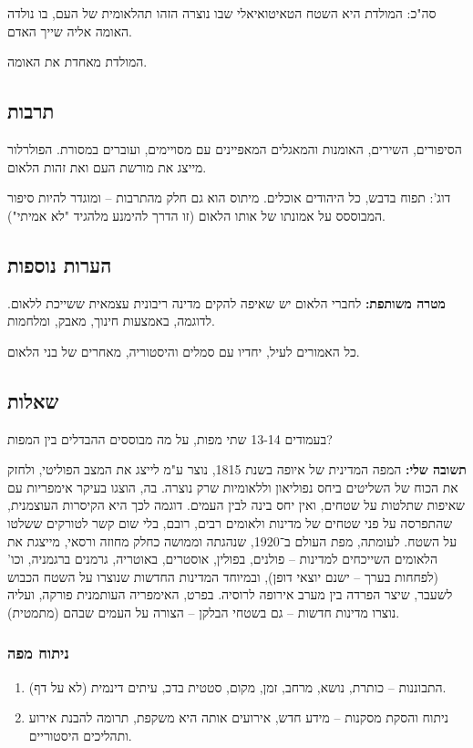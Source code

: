 \documentclass[a4paper]{book}
\begin{document}
	סה"כ: המולדת היא השטח הטאיטואיאלי שבו נוצרה הזהו תהלאומית של העם, בו נולדה האומה אליה שייך האדם. 
	
	המולדת מאחדת את האומה. 
	
	\subsection{תרבות}
	הסיפורים, השירים, האומנות והמאגלים המאפיינים עם מסויימים, ועוברים במסורת. הפולרלור מייצג את מורשת העם ואת זהות הלאום. 
	
	דוג': תפוח בדבש, כל היהודים אוכלים. מיתוס הוא גם חלק מהתרבות – ומוגדר להיות סיפור המבוססס על אמונתו של אותו הלאום (זו הדרך להימנע מלהגיד "לא אמיתי"). 
	
	\subsection{הערות נוספות}
	
	\textbf{מטרה משותפת: }לחברי הלאום יש שאיפה להקים מדינה ריבונית עצמאית ששייכת ללאום. לדוגמה, באמצעות חינוך, מאבק, ומלחמות. 
	
	כל האמורים לעיל, יחדיו עם סמלים והיסטוריה, מאחרים של בני הלאום. 
	
	\subsection{שאלות}
	בעמודים 13-14 שתי מפות, על מה מבוססים ההבדלים בין המפות? 
	
	\textbf{תשובה שלי: }המפה המדינית של איופה בשנת 1815, נוצר ע"מ לייצג את המצב הפוליטי, ולחזק את הכוח של השליטים ביחס נפוליאון וללאומיות שרק נוצרה. בה, הוצגו בעיקר אימפריות עם שאיפות שתלטות על שטחים, ואין יחס בינה לבין העמים. דוגמה לכך היא הקיסרות העוצמנית, שהתפרסה על פני שטחים של מדינות ולאומים רבים, רובם, בלי שום קשר לטורקים ששלטו על השטח. לעומתה, מפת העולם ב־1920, שנהגתה וממושה כחלק מחוזה ורסאי, מייצגת את הלאומים השייכחים למדינות – פולנים, בפולין, אוסטרים, באוטריה, גרמנים ברגמניה, וכו' (לפחחות בערך – ישנם יוצאי דופן), ובמיוחד המדינות החדשות שנוצרו על השטח הכבוש לשעבר, שיצר הפרדה בין מערב אירופה לרוסיה. בפרט, האימפריה העותמנית פורקה, ועליה נוצרו מדינות חדשות – גם בשטחי הבלקן – הצורה על העמים שבהם (מתמטית). 
	
	\subsubsection{ניתוח מפה}
	
	\begin{enumerate}
		\item התבוננות – כותרת, נושא, מרחב, זמן, מקום, סטטית בדכ, עיתים דינמית (לא על דף). 
		\item ניתוח והסקת מסקנות – מידע חדש, אירועים אותה היא משקפת, תרומה להבנת אירוע ותהליכים היסטוריים. 
	\end{enumerate}
	
\end{document}

